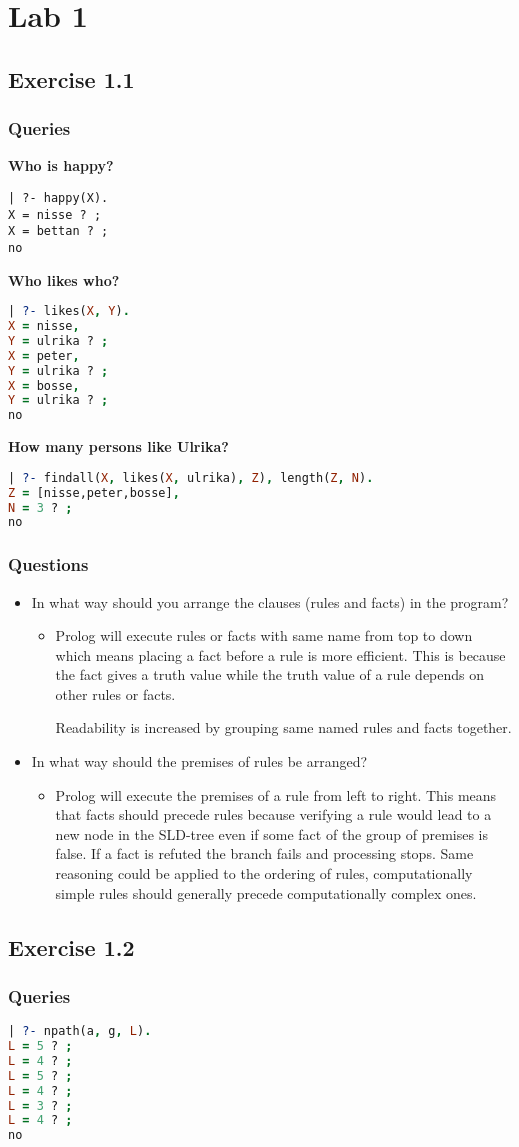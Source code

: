 \section{Lab 1}
\subsection{Exercise 1.1}

\subsubsection{Queries}
\textbf{Who is happy?}
\begin{lstlisting}
| ?- happy(X).
X = nisse ? ;
X = bettan ? ;
no
\end{lstlisting}
\textbf{Who likes who?}
\begin{lstlisting}[language=Prolog]
| ?- likes(X, Y).
X = nisse,
Y = ulrika ? ;
X = peter,
Y = ulrika ? ;
X = bosse,
Y = ulrika ? ;
no
\end{lstlisting}
\textbf{How many persons like Ulrika?}
\begin{lstlisting}[language=Prolog]
| ?- findall(X, likes(X, ulrika), Z), length(Z, N).
Z = [nisse,peter,bosse],
N = 3 ? ;
no
\end{lstlisting}
\pagebreak
\subsubsection{Questions}
\begin{itemize}
  \item In what way should you arrange the clauses (rules and facts) in the program?
  \begin{itemize}
    \item Prolog will execute rules or facts with same name from top to down which means placing a fact before a rule is more efficient. This is because the fact gives a truth value while the truth value of a rule depends on other rules or facts.

    Readability is increased by grouping same named rules and facts together. 
  \end{itemize}
  \item In what way should the premises of rules be arranged?
  \begin{itemize}
    \item Prolog will execute the premises of a rule from left to right. This means that facts should precede rules because verifying a rule would lead to a new node in the SLD-tree even if some fact of the group of premises is false. If a fact is refuted the branch fails and processing stops. Same reasoning could be applied to the ordering of rules, computationally simple rules should generally precede computationally complex ones.
  \end{itemize}
\end{itemize}

\pagebreak

\subsection{Exercise 1.2}

\subsubsection{Queries}
\begin{lstlisting}[language=Prolog]
| ?- npath(a, g, L).
L = 5 ? ;
L = 4 ? ;
L = 5 ? ;
L = 4 ? ;
L = 3 ? ;
L = 4 ? ;
no
\end{lstlisting} 